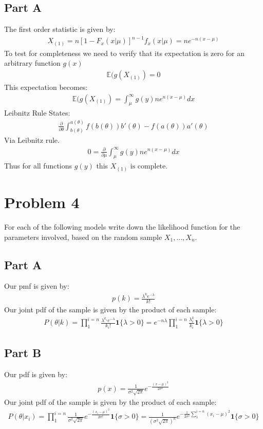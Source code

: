 \documentclass{article}
\begin{document}
\subsection*{Part A}
The first order statistic is given by:
\begin{align*}
X_{(1)} = n[1-F_x(x|\mu)]^{n-1}f_x(x|\mu) = n e^{-n(x-\mu)}
\end{align*}
To test for completeness we need to verify that its expectation is zero for an arbitrary function $g(x)$
\begin{align*}
\mathbb{E}(g(X_{(1)}) = 0
\end{align*}
This expectation becomes:
\begin{align*}
\mathbb{E}(g(X_{(1)}) = \int_{\mu}^{\infty} g(y) n e^{n(x-\mu)} dx
\end{align*}
Leibnitz Rule States:
\begin{align*}
\frac{\partial }{\partial \theta} \int_{b(\theta)}^{a(\theta)} f(b(\theta))b'(\theta) - f(a(\theta)) a'(\theta)
\end{align*}
Via Leibnitz rule.
\begin{align*}
0 = \frac{\partial}{\partial \mu} \int_{\mu}^{\infty} g(y) n e^{n(x-\mu)} dx
\end{align*}
Thus for all functions $g(y)$ this $\boxed{ X_{(1)}\text{ is complete.} } $



\clearpage

\section*{Problem 4}
For each of the following models write down the likelihood function for the parameters involved, based on the random sample $X_1,...,X_n$.
\subsection*{Part A}
Our pmf is given by:
\begin{align*}
p(k) = \frac{\lambda^k e^{-\lambda}}{k!}
\end{align*}
Our joint pdf of the sample is given by the product of each sample:
\begin{align*}
\boxed{ P(\theta|k) = \prod_{1}^{i=n} \frac{\lambda^{k_i} e^{-\lambda}}{k_i!} \mathbf{1}\{\lambda > 0 \} = e^{-n \lambda}\prod_{1}^{i=n} \frac{\lambda^k_i}{k_i} \mathbf{1}\{\lambda > 0 \} }
\end{align*}
\subsection*{Part B}
Our pdf is given by:
\begin{align*}
p(x) = \frac{1}{\sigma^2 \sqrt{2\pi}} e^{-\frac{(x-\mu)^2}{2\sigma^2}}
\end{align*}
Our joint pdf of the sample is given by the product of each sample:
\begin{align*}
P(\theta|x_i) = \prod_{1}^{i=n} \frac{1}{\sigma^2 \sqrt{2\pi}} e^{-\frac{(x_i-\mu)^2}{2\sigma^2}} \mathbf{1}\{\sigma > 0 \}  = \boxed{ \frac{1}{(\sigma^2 \sqrt{2\pi})^n} e^{-\frac{1}{2\sigma^2}\sum_{1}^{i=n} (x_i-\mu)^2} \mathbf{1}\{\sigma > 0 \}}
\end{align*}
\end{document}
